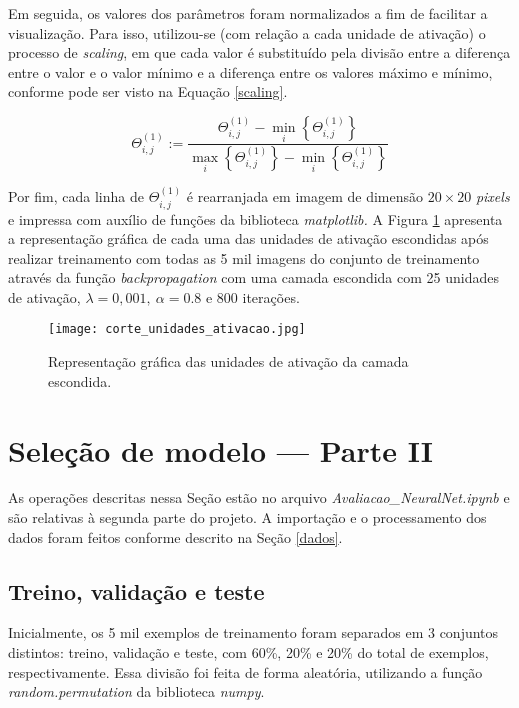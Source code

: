 \documentclass[12pt]{article}
\begin{document}
Em seguida, os valores dos parâmetros foram normalizados a fim de facilitar a visualização. Para isso, utilizou-se (com relação a cada unidade de ativação) o processo de \textit{scaling}, em que cada valor é substituído pela divisão entre a diferença entre o valor e o valor mínimo e a diferença entre os valores máximo e mínimo, conforme pode ser visto na Equação \ref{scaling}.

\begin{equation} \label{scaling}
\Theta^{(1)}_{i,j} := \frac{ \Theta^{(1)}_{i,j} - \min\limits_i\left\{\Theta^{(1)}_{i,j}\right\}}{\max\limits_i\left\{\Theta^{(1)}_{i,j}\right\} - \min\limits_i\left\{\Theta^{(1)}_{i,j}\right\}}
\end{equation}

Por fim, cada linha de $\Theta^{(1)}_{i,j}$ é rearranjada em imagem de dimensão $20 \times 20$ \textit{pixels} e impressa com auxílio de funções da biblioteca \textit{matplotlib.} A Figura \ref{img_un_escond} apresenta a representação gráfica de cada uma das unidades de ativação escondidas após realizar treinamento com todas as 5 mil imagens do conjunto de treinamento através da função \textit{backpropagation} com uma camada escondida com 25 unidades de ativação, $\lambda = 0,001, \ \alpha = 0.8$ e 800 iterações.

\begin{figure}
\begin{center}
\texttt{[image: corte\_unidades\_ativacao.jpg]}
\caption{Representação gráfica das unidades de ativação da camada escondida.} \label{img_un_escond}
\end{center}
\end{figure}

\section{Seleção de modelo --- Parte II} \label{parte2}
As operações descritas nessa Seção estão no arquivo \textit{Avaliacao\_NeuralNet.ipynb} e são relativas à segunda parte do projeto. A importação e o processamento dos dados foram feitos conforme descrito na Seção \ref{dados}.


\subsection{Treino, validação e teste} \label{treino, val, teste}
\indent Inicialmente, os 5 mil exemplos de treinamento foram separados em 3 conjuntos distintos: treino, validação e teste, com 60\%, 20\% e 20\% do total de exemplos, respectivamente. Essa divisão foi feita de forma aleatória, utilizando a função \textit{random.permutation} da biblioteca \textit{numpy}.
\end{document}

